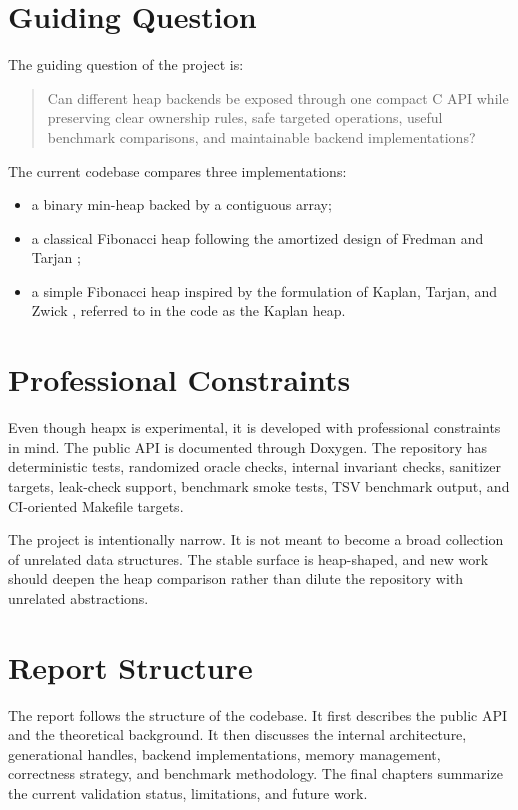 \section{Guiding Question}

The guiding question of the project is:

\begin{quote}
    Can different heap backends be exposed through one compact C API while preserving clear ownership rules, safe targeted operations, useful benchmark comparisons, and maintainable backend implementations?
\end{quote}

The current codebase compares three implementations:

\begin{itemize}
    \item a binary min-heap backed by a contiguous array;
    \item a classical Fibonacci heap following the amortized design of Fredman and Tarjan \cite{fredman1987fibonacci};
    \item a simple Fibonacci heap inspired by the formulation of Kaplan, Tarjan, and Zwick \cite{kaplan2014fibonacci}, referred to in the code as the Kaplan heap.
\end{itemize}

\section{Professional Constraints}

Even though heapx is experimental, it is developed with professional constraints in mind.
The public API is documented through Doxygen.
The repository has deterministic tests, randomized oracle checks, internal invariant checks, sanitizer targets, leak-check support, benchmark smoke tests, TSV benchmark output, and CI-oriented Makefile targets.

The project is intentionally narrow.
It is not meant to become a broad collection of unrelated data structures.
The stable surface is heap-shaped, and new work should deepen the heap comparison rather than dilute the repository with unrelated abstractions.

\section{Report Structure}

The report follows the structure of the codebase.
It first describes the public API and the theoretical background.
It then discusses the internal architecture, generational handles, backend implementations, memory management, correctness strategy, and benchmark methodology.
The final chapters summarize the current validation status, limitations, and future work.
